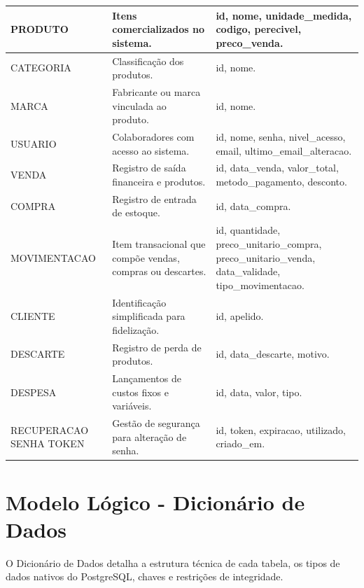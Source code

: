 \documentclass[
	12pt,				%
	openany,			%
	oneside,			%
	a4paper,			%
	english,			%
	french,				%
	spanish,			%
	brazil				%
	]{abntex2}
\begin{document}
\begin{apendicesenv}
\begin{longtable}{|>{\raggedright\arraybackslash}m{4cm}|>{\raggedright\arraybackslash}m{5cm}|>{\raggedright\arraybackslash}m{6cm}|}
    PRODUTO & Itens comercializados no sistema. & id, nome, unidade\_medida, codigo, perecivel, preco\_venda. \\
    \hline
    CATEGORIA & Classificação dos produtos. & id, nome. \\
    \hline
    MARCA & Fabricante ou marca vinculada ao produto. & id, nome. \\
    \hline
    USUARIO & Colaboradores com acesso ao sistema. & id, nome, senha, nivel\_acesso, email, ultimo\_email\_alteracao. \\
    \hline
    VENDA & Registro de saída financeira e produtos. & id, data\_venda, valor\_total, metodo\_pagamento, desconto. \\
    \hline
    COMPRA & Registro de entrada de estoque. & id, data\_compra. \\
    \hline
    MOVIMENTACAO & Item transacional que compõe vendas, compras ou descartes. & id, quantidade, preco\_unitario\_compra, preco\_unitario\_venda, data\_validade, tipo\_movimentacao. \\
    \hline
    CLIENTE & Identificação simplificada para fidelização. & id, apelido. \\
    \hline
    DESCARTE & Registro de perda de produtos. & id, data\_descarte, motivo. \\
    \hline
    DESPESA & Lançamentos de custos fixos e variáveis. & id, data, valor, tipo. \\
    \hline
    RECUPERACAO SENHA TOKEN & Gestão de segurança para alteração de senha. & id, token, expiracao, utilizado, criado\_em. \\
    \hline
\end{longtable}

\section{Modelo Lógico - Dicionário de Dados}

O Dicionário de Dados detalha a estrutura técnica de cada tabela, os tipos de dados nativos do PostgreSQL, chaves e restrições de integridade.


\end{apendicesenv}
\end{document}
